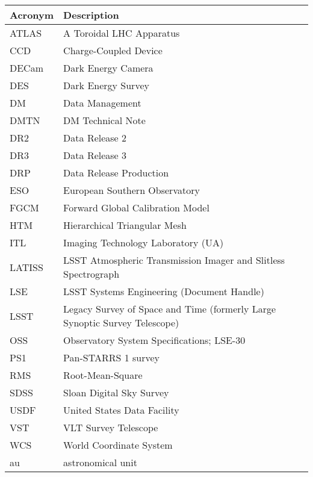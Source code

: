 \addtocounter{table}{-1}
\begin{longtable}{p{}p{}}\hline
\textbf{Acronym} & \textbf{Description}  \\\hline

ATLAS & A Toroidal LHC Apparatus \\\hline
CCD & Charge-Coupled Device \\\hline
DECam & Dark Energy Camera \\\hline
DES & Dark Energy Survey \\\hline
DM & Data Management \\\hline
DMTN & DM Technical Note \\\hline
DR2 & Data Release 2 \\\hline
DR3 & Data Release 3 \\\hline
DRP & Data Release Production \\\hline
ESO & European Southern Observatory \\\hline
FGCM & Forward Global Calibration Model \\\hline
HTM & Hierarchical Triangular Mesh \\\hline
ITL & Imaging Technology Laboratory (UA) \\\hline
LATISS & LSST Atmospheric Transmission Imager and Slitless Spectrograph \\\hline
LSE & LSST Systems Engineering (Document Handle) \\\hline
LSST & Legacy Survey of Space and Time (formerly Large Synoptic Survey Telescope) \\\hline
OSS & Observatory System Specifications; LSE-30 \\\hline
PS1 & Pan-STARRS 1 survey \\\hline
RMS & Root-Mean-Square \\\hline
SDSS & Sloan Digital Sky Survey \\\hline
USDF & United States Data Facility \\\hline
VST & VLT Survey Telescope \\\hline
WCS & World Coordinate System \\\hline
au & astronomical unit \\\hline
\end{longtable}
